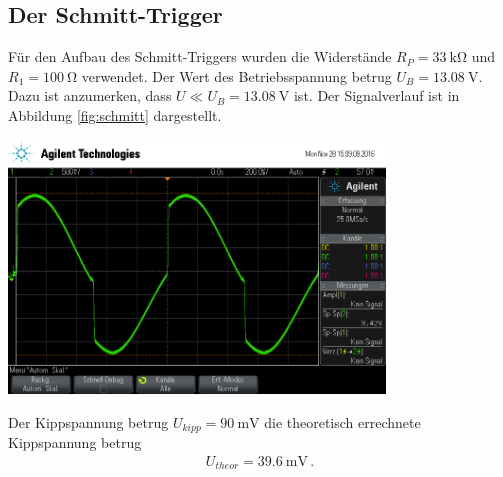 \documentclass[]{scrartcl}
\begin{document}
\subsection{Der Schmitt-Trigger}
Für den Aufbau des Schmitt-Triggers wurden die Widerstände $R_P=\SI{33}{\kilo\ohm}$ und $R_1=\SI{100}{\ohm}$ verwendet. Der Wert des Betriebsspannung betrug $U_B=\SI{13.08}{\volt}$. Dazu ist anzumerken, dass $U\ll U_B=\SI{13.08}{\volt}$ ist. Der Signalverlauf ist in Abbildung \ref{fig:schmitt} dargestellt.\\
\begin{center}
	\includegraphics[width=10cm]{images/schmitt.png}
	\label{fig:schmitt}
\end{center}
Der Kippspannung betrug $U_{kipp}=\SI{90}{\milli\volt}$ die theoretisch errechnete Kippspannung betrug
\begin{align*}
U_{theor}=\SI{39.6}{\milli\volt}\,.
\end{align*}
\end{document}
